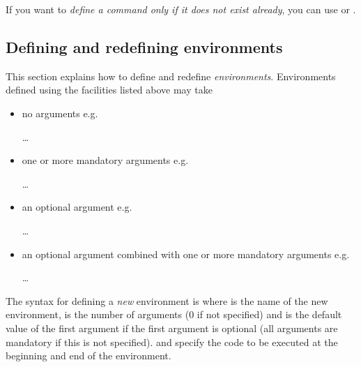 If you want to \emph{define a command only if it does not exist already}, you can use  or .

\subsection{Defining and redefining environments}\label{subsec:env}

This section explains how to define and redefine \emph{environments}.
Environments defined using the \LaTeXe{} facilities listed above may take
\begin{itemize}
  \item no arguments e.g.~
  \begin{semiverbatim}
     \dots{} 
  \end{semiverbatim}
  \item one or more mandatory arguments e.g.~
  \begin{semiverbatim}
     \dots{} 
  \end{semiverbatim}
  \item an optional argument e.g.~
  \begin{semiverbatim}
     \dots{} 
  \end{semiverbatim}
  \item an optional argument combined with one or more mandatory arguments e.g.~
  \begin{semiverbatim}
     \dots{} 
  \end{semiverbatim}
\end{itemize}
The syntax for defining a \emph{new} environment is
where  is the name of the new environment,  is the number of arguments (0 if not specified) and  is the default value of the first argument if the first argument is optional (all arguments are mandatory if this is not specified).
 and  specify the code to be executed at the beginning and end of the environment.

